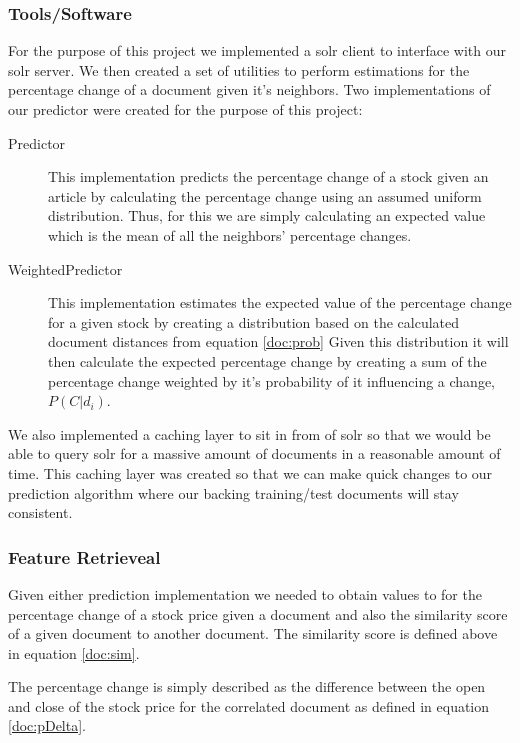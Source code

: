 \documentclass[11pt,letterpaper]{article}
\begin{document}
\subsubsection{Tools/Software}
For the purpose of this project we implemented a solr client to interface with our solr server.  We then created a set of utilities to perform estimations for the percentage change of a document given it's neighbors.  Two implementations of our predictor were created for the purpose of this project:
\begin{description}
	\item[Predictor]
	 This implementation predicts the percentage change of a stock given an article by calculating the percentage change using an assumed uniform distribution.  Thus, for this we are simply calculating an expected value which is the mean of all the neighbors' percentage changes.
	 \item[WeightedPredictor]
	 This implementation estimates the expected value of the percentage change for a given stock by creating a distribution based on the calculated document distances from equation \eqref{doc:prob}
	 Given this distribution it will then calculate the expected percentage change by creating a sum of the percentage change weighted by it's probability of it influencing a change, \(P(C | d_i)\).
\end{description}
We also implemented a caching layer to sit in from of solr so that we would be able to query solr for a massive amount of documents in a reasonable amount of time.  This caching layer was created so that we can make quick changes to our prediction algorithm where our backing training/test documents will stay consistent.

\subsubsection{Feature Retrieveal}
Given either prediction implementation we needed to obtain values to for the percentage change of a stock price given a document and also the similarity score of a given document to another document.  The similarity score is defined above in equation \eqref{doc:sim}. 

The percentage change is simply described as the difference between the open and close of the stock price for the correlated document as defined in equation \eqref{doc:pDelta}.
\end{document}
